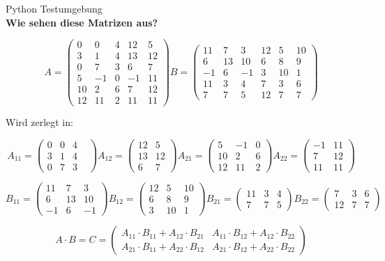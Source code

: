 \documentclass{article}
\begin{document}
\begin{center}
{\Large Python Testumgebung}\\[3ex]
{\bf Wie sehen diese Matrizen aus?}
\end{center}
\bigskip


\[A=
\begin{pmatrix}
  0& 0& 4& 12& 5\\
  3& 1 &4 &13& 12\\
  0& 7& 3& 6& 7\\
  5& -1& 0& -1& 11\\
  10& 2& 6 &7 &12\\
  12& 11& 2& 11& 11
\end{pmatrix} 
B=
\begin{pmatrix}
11& 7& 3& 12& 5& 10\\
6& 13& 10 &6 &8 &9\\
-1& 6 &-1 &3 &10& 1\\
11& 3& 4& 7& 3& 6\\
7& 7 &5 &12& 7& 7  
\end{pmatrix}\]
\begin{center}
  Wird zerlegt in:
  \end{center}
\[A_{11}=
\begin{pmatrix}
  0& 0& 4&\\
  3& 1 &4 \\
  0& 7& 3&
\end{pmatrix}
A_{12}=
\begin{pmatrix}
12& 5\\
13& 12\\
6& 7
\end{pmatrix}
A_{21}=
\begin{pmatrix}
5& -1& 0\\
10& 2& 6\\
12& 11& 2
\end{pmatrix}
A_{22}=
\begin{pmatrix}
-1& 11\\
7& 12\\
11& 11
\end{pmatrix}\]

\[B_{11}=
\begin{pmatrix}
11& 7& 3\\
6& 13& 10\\
-1& 6& -1
\end{pmatrix}
B_{12}=
\begin{pmatrix}
12& 5& 10\\
6& 8&  9\\
3& 10& 1
\end{pmatrix}
B_{21}=
\begin{pmatrix}
11& 3& 4\\
7& 7& 5
\end{pmatrix}
B_{22}=
\begin{pmatrix}
7& 3& 6\\
12& 7& 7
\end{pmatrix}\]  

\[A\cdot B=C=
\begin{pmatrix}
  A_{11}\cdot B_{11} + A_{12}\cdot B_{21} & A_{11}\cdot B_{12} + A_{12}\cdot B_{22}\\
  A_{21}\cdot B_{11} + A_{22}\cdot B_{12} & A_{21}\cdot B_{12} + A_{22}\cdot B_{22}
  \end{pmatrix}\]
\end{document}
